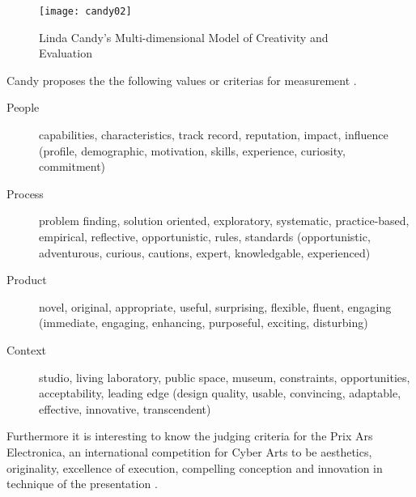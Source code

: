 \begin{figure}[htb] %
  \centering
  \texttt{[image: candy02]}
\caption[Multi-dimensional Model of Creativity and Evaluation]{Linda Candy's Multi-dimensional Model of Creativity and Evaluation}
\label{fig:candy02}
\end{figure}

Candy proposes the the following values or criterias for measurement \autocite{Candy2012}.

\begin{description}
  \item [People] capabilities, characteristics, track record, reputation, impact, influence (profile, demographic, motivation, skills, experience, curiosity, commitment)
  \item [Process] problem finding, solution oriented, exploratory, systematic, practice-based, empirical, reflective, opportunistic, rules, standards (opportunistic, adventurous, curious, cautions, expert, knowledgable, experienced)
  \item [Product] novel, original, appropriate, useful, surprising, flexible, fluent, engaging (immediate, engaging, enhancing, purposeful, exciting, disturbing)
  \item [Context] studio, living laboratory, public space, museum, constraints, opportunities, acceptability, leading edge (design quality, usable, convincing, adaptable, effective, innovative, transcendent)
\end{description}

Furthermore it is interesting to know the judging criteria for the Prix Ars Electronica, an international competition for Cyber Arts to be aesthetics, originality, excellence of execution, compelling conception and innovation in technique of the presentation \autocite[cited in][p.18]{Candy2012}.


\stopcontents[chapters]
